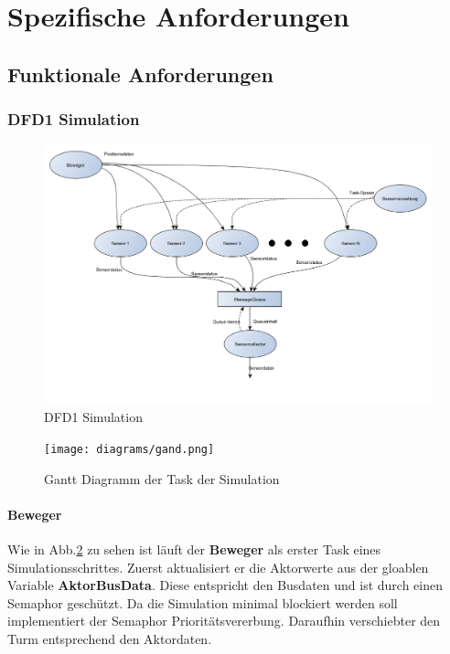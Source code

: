 \section{Spezifische Anforderungen}
\subsection{Funktionale Anforderungen}
\subsubsection{DFD1 Simulation}
\begin{figure}[H]
	\centering
  \includegraphics[width=\textwidth]{DFD/dfd1_simulation1_1.png}
	\caption{DFD1 Simulation}
	\label{fig1}
\end{figure}
\begin{figure}[H]
	\centering
  \texttt{[image: diagrams/gand.png]}
	\caption{Gantt Diagramm der Task der Simulation}
	\label{gantt}
\end{figure}

\paragraph{Beweger}
Wie in Abb.\ref{gantt} zu sehen ist läuft der \textbf{Beweger} als erster Task eines Simulationsschrittes. Zuerst aktualisiert er die Aktorwerte aus der gloablen Variable \textbf{AktorBusData}. Diese entspricht den Busdaten  und ist durch einen Semaphor geschützt. Da die Simulation minimal blockiert werden soll implementiert der Semaphor Prioritätsvererbung. Daraufhin \glqq verschiebt\grqq er den Turm entsprechend den Aktordaten.

